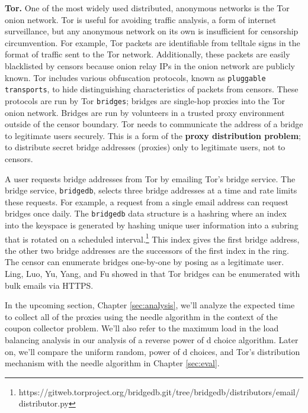 \textbf{Tor.} One of the most widely used distributed, anonymous networks is the Tor onion network. Tor is useful for avoiding traffic analysis, a form of internet surveillance, but any anonymous network on its own is insufficient for censorship circumvention. For example, Tor packets are identifiable from telltale signs in the format of traffic sent to the Tor network. Additionally, these packets are easily blacklisted by censors because onion relay IPs in the onion network are publicly known. Tor includes various obfuscation protocols, known as \texttt{pluggable transports}, to hide distinguishing characteristics of packets from censors. These protocols are run by Tor \texttt{bridges}; bridges are single-hop proxies into the Tor onion network. Bridges are run by volunteers in a trusted proxy environment outside of the censor boundary. Tor needs to communicate the address of a bridge to legitimate users securely. This is a form of the \textbf{proxy distribution problem}; to distribute secret bridge addresses (proxies) only to legitimate users, not to censors. 

A user requests bridge addresses from Tor by emailing Tor's bridge service. The bridge service, \texttt{bridgedb}, selects three bridge addresses at a time and rate limits these requests. For example, a request from a single email address can request bridges once daily. The \texttt{bridgedb} data structure is a hashring where an index into the keyspace is generated by hashing unique user information into a subring that is rotated on a scheduled interval.\footnote{https://gitweb.torproject.org/bridgedb.git/tree/bridgedb/distributors/email/distributor.py} This index gives the first bridge address, the other two bridge addresses are the successors of the first index in the ring. The censor can enumerate bridges one-by-one by posing as a legitimate user. Ling, Luo, Yu, Yang, and Fu showed in \cite{ling2015tor} that Tor bridges can be enumerated with bulk emails via HTTPS.

In the upcoming section, Chapter \ref{sec:analysis}, we'll analyze the expected time to collect all of the proxies using the needle algorithm in the context of the coupon collector problem. We'll also refer to the maximum load in the load balancing analysis in our analysis of a reverse power of d choice algorithm. Later on, we'll compare the uniform random, power of d choices, and Tor's distribution mechanism with the needle algorithm in Chapter \ref{sec:eval}.